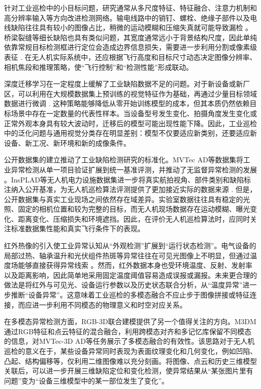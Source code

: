 针对工业巡检中的小目标问题，研究通常从多尺度特征、特征融合、注意力机制和高分辨率输入等方向改进检测网络。输电线路中的销钉、螺栓、绝缘子部件以及电线缺陷往往具有较小的图像占比，稍微的运动模糊和压缩失真就可能导致漏检
\cite{nguyen2018automatic,tao2020detection,zhouwq2024review}。桥梁裂缝等细长缺陷也具有类似问题，其宽度通常远小于背景结构尺度，因此单纯依靠常规目标检测框进行定位会造成边界信息损失，需要进一步利用分割或像素级表征
\cite{yang2018pixel,yeum2015vision,cha2017deep}. 在无人机实际系统中，还应根据飞行高度和目标尺寸动态决定图像分辨率、相机焦段和推理策略，使“飞行控制”和“检测性能”形成联动。

深度迁移学习在一定程度上缓解了工业缺陷数据不足的问题。对于新设备或新厂区，可以利用在大规模数据集上预训练的视觉特征作为基础，再通过少量目标领域数据进行微调
\cite{gao2018deep}. 这种策略能够降低从零开始训练模型的成本，但其本质仍然依赖目标场景中存在一定数量的代表性样本。当设备型号发生变化、拍摄角度发生变化或正常外观本身具有较大波动时，迁移后的模型可能出现性能下降。因此，工业巡检中的泛化问题与通用视觉分类存在明显差别：模型不仅要适应新类别，还要适应新设备、新工况、新环境和新的成像条件。

公开数据集的建立推动了工业缺陷检测研究的标准化。MVTec AD等数据集将工业异常检测从单一项目验证扩展到统一基准评测，并推动了无监督异常检测的发展
\cite{bergmann2019mvtec}。InsPLAD等无人机电力设施数据集进一步将真实航拍视角、部件类别和缺陷标注纳入公开基准，为无人机巡检算法评测提供了更加接近实际的数据来源
\cite{vieira2023insplad}. 但是，公开数据集与真实工业现场之间依然存在域差异。实验室数据往往具有稳定的光照、固定的相机位置和较为完整的目标，而无人机现场数据存在运动模糊、曝光变化、距离变化、压缩损失和环境遮挡。因此，在评价无人机巡检算法时，应同时关注标准数据集性能和真实飞行条件下的表现。

红外热像的引入使工业异常认知从“外观检测”扩展到“运行状态检测”。电气设备的局部过热、轴承温升和光伏组件热斑等异常往往在可见光图像上不明显，但通过温度场能够直接获得异常线索
\cite{jadin2012recent,usamentiaga2014infrared}。然而，红外数据本身也受环境温度、反射、发射率以及距离影响，因此简单地采用固定温度阈值容易造成误报或漏报。未来更合理的做法是将红外与可见光、设备运行参数以及历史状态联合分析，从“温度异常”进一步推断“设备异常”。这意味着工业巡检的多模态融合不应止步于图像拼接或特征连接，而应进一步利用不同模态的物理意义和时空对应关系。

在多模态异常检测方面，RGB-3D联合建模提供了另一个值得关注的方向。M3DM通过RGB特征和点云特征的混合融合，利用跨模态对齐和多记忆库保留不同模态的信息，对MVTec-3D AD等任务展示了多模态融合的有效性。该思路对于无人机巡检的意义在于，某些设备异常同时表现为表面纹理变化和几何变化，例如凹陷、凸起、结构偏移等，仅利用二维图像难以充分刻画。将图像、点云和历史三维模型关联后，可以进一步开展三维缺陷定位和变化检测，使异常结果从“某张图片里有问题”变为“设备三维模型中的某一部位发生了变化”。

